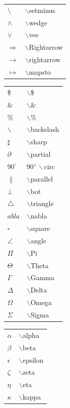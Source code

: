 \documentclass[10pt]{beamer}
\begin{document}
\begin{frame}
\begin{tabular}{ll}
$\setminus $ &  $\backslash$setminus \\
$\wedge $ &  $\backslash$wedge \\
$\vee $ &  $\backslash$vee \\
$\Rightarrow$ &  $\backslash$Rightarrow \\
$\rightarrow$ &  $\backslash$rightarrow \\
$\mapsto$ &  $\backslash$mapsto \\
\end{tabular}
\hspace*{1ex}
\begin{tabular}{ll}
\$ & $\backslash$\$ \\
\& & $\backslash$\& \\
\% & $\backslash$\% \\
$\backslash$ & $\backslash$backslash \\
$\sharp$ & $\backslash$sharp \\
$\partial$ &  $\backslash$partial \\
$90^\circ$ &  90$^\wedge\backslash$circ \\
$\parallel$ &  $\backslash$parallel \\
$\bot$ &  $\backslash$bot \\
$\triangle$ &  $\backslash$triangle \\
$
abla$ &   $\backslash$nabla \\
$\square$ &  $\backslash$square \\
$\angle$ &  $\backslash$angle \\
$\Pi$ &  $\backslash$Pi \\
$\Theta$ &  $\backslash$Theta \\
$\Gamma$ &  $\backslash$Gamma \\
$\Delta$ &  $\backslash$Delta \\
$\Omega$ &  $\backslash$Omega \\
$\Sigma$ &  $\backslash$Sigma \\
\end{tabular}
\hspace*{1ex}
\begin{tabular}{ll}
$\alpha$ &  $\backslash$alpha \\
$\beta$ &  $\backslash$beta \\
$\epsilon$ &  $\backslash$epsilon \\
$\zeta$ &  $\backslash$zeta \\
$\eta$ &  $\backslash$eta \\
$\kappa$ &  $\backslash$kappa \\

\end{tabular}
\end{frame}
\end{document}
